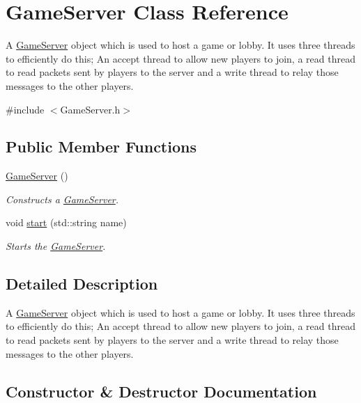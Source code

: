 \hypertarget{classGameServer}{}\section{Game\+Server Class Reference}
\label{classGameServer}


A \hyperlink{classGameServer}{Game\+Server} object which is used to host a game or lobby. It uses three threads to efficiently do this; An accept thread to allow new players to join, a read thread to read packets sent by players to the server and a write thread to relay those messages to the other players.  




{\ttfamily \#include $<$Game\+Server.\+h$>$}

\subsection*{Public Member Functions}
\begin{DoxyCompactItemize}
\item 
\hyperlink{classGameServer_a50105d853ed8cf180553e0f5a2d8f0ad}{Game\+Server} ()
\begin{DoxyCompactList}\small\item\em Constructs a \hyperlink{classGameServer}{Game\+Server}. \end{DoxyCompactList}\item 
void \hyperlink{classGameServer_affe7e5aff5265d16956d595f99650d0b}{start} (std\+::string name)
\begin{DoxyCompactList}\small\item\em Starts the \hyperlink{classGameServer}{Game\+Server}. \end{DoxyCompactList}\end{DoxyCompactItemize}


\subsection{Detailed Description}
A \hyperlink{classGameServer}{Game\+Server} object which is used to host a game or lobby. It uses three threads to efficiently do this; An accept thread to allow new players to join, a read thread to read packets sent by players to the server and a write thread to relay those messages to the other players. 

\subsection{Constructor \& Destructor Documentation}
\mbox{\label{classGameServer_a50105d853ed8cf180553e0f5a2d8f0ad}} 
